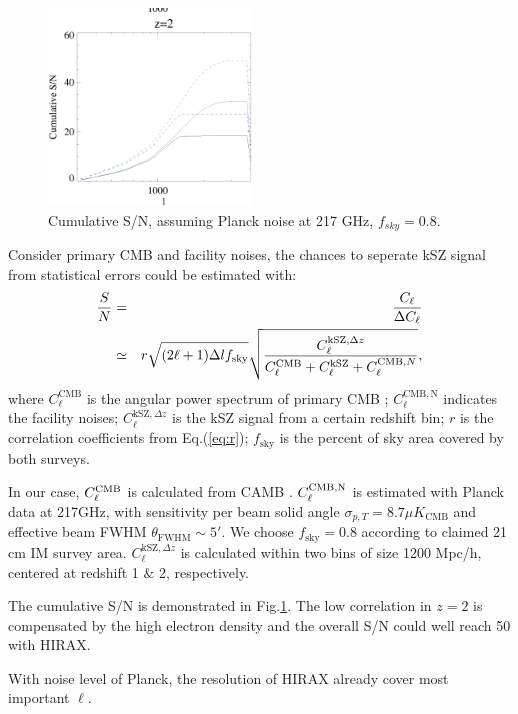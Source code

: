 \begin{figure}[tbp]
\begin{center}
\includegraphics[width=0.48\textwidth]{figure/sn_z1_z2.eps}
\end{center}
\vspace{-0.7cm}
\caption{Cumulative S/N, assuming Planck noise at 217 GHz, $f_{sky}=0.8$. 
}
\label{fig:sn}
\end{figure}
Consider primary CMB and facility noises, 
the chances to seperate kSZ signal from statistical errors could be estimated 
with:
\begin{eqnarray}
    \frac{S}{N}&=&\frac{C_\ell}{\Delta C_\ell}\\\nonumber
               &\simeq&
    r\sqrt{(2\ell+1)\Delta l f_\mathrm{sky}}\sqrt{\frac{C_\ell^{\mathrm{kSZ},\Delta z}}{C_\ell^{\mathrm{CMB}}+C_\ell^\mathrm{kSZ}+C_\ell^{\mathrm{CMB},N}}},
\end{eqnarray}
where $C_\ell^\mathrm{CMB}$ is the angular power spectrum of primary CMB 
;
$C_\ell^\mathrm{CMB,N}$ indicates the facility noises; 
$C_\ell^{\mathrm{kSZ},\Delta z}$ is the kSZ signal from a certain redshift bin; 
$r$ is the correlation coefficients from Eq.(\ref{eq:r}); 
$f_\mathrm{sky}$ is the percent of sky area covered by both surveys.

In our case, $C_\ell^\mathrm{CMB}$ is calculated from CAMB \cite{CAMB}. 
$C_\ell^\mathrm{CMB,N}$ is estimated with Planck data \cite{Planck2015} at 217GHz, with 
sensitivity per beam solid angle $\sigma_{p,T}=8.7\mu K_\mathrm{CMB}$  
and effective beam FWHM $\theta_\mathrm{FWHM}\sim 5'$. 
We choose $f_\mathrm{sky}=0.8$ according to claimed 21 cm IM survey area. 
$C_\ell^{\mathrm{kSZ},\Delta z}$ is calculated within two bins of size 1200 Mpc/h, centered at redshift 1 $\&$ 2, respectively.

The cumulative S/N is demonstrated in Fig.\ref{fig:sn}. 
The low correlation in $z=2$ is compensated by the high electron density 
and the overall S/N could well reach 50 with HIRAX.

With noise level of Planck, 
the resolution of HIRAX already cover most important $\ell$. 
